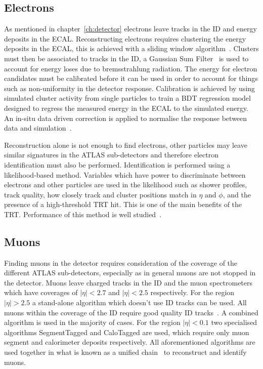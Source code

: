\subsection{Electrons}
\label{subsec:electrons}

As mentioned in chapter~\ref{ch:detector} electrons leave tracks in the ID and
energy deposits in the ECAL. Reconstructing electrons requires clustering the
energy deposits in the ECAL, this is achieved with a sliding window
algorithm~\cite{Delmastro:1747242}. Clusters must then be associated to tracks
in the ID, a Gaussian Sum Filter~\cite{ATLAS-CONF-2012-047} is used to account
for energy loses due to bremsstrahlung radiation. The energy for electron
candidates must be calibrated before it can be used in order to account for
things such as non-uniformity in the detector response. Calibration is achieved
by using simulated cluster activity from single particles to train a BDT
regression model designed to regress the measured energy in the ECAL to the
simulated energy. An in-situ data driven correction is applied to normalise the
response between data and simulation~\cite{ATL-PHYS-PUB-2016-015}.

Reconstruction alone is not enough to find electrons, other particles may leave
similar signatures in the ATLAS sub-detectors and therefore electron
identification must also be performed. Identification is performed using a
likelihood-based method. Variables which have power to discriminate between
electrons and other particles are used in the likelihood such as shower
profiles, track quality, how closely track and cluster positions match in $\eta$
and $\phi$, and the presence of a high-threshold TRT hit. This is one of the
main benefits of the TRT. Performance of this method is well
studied~\cite{ATLAS-CONF-2016-024,EgammaEffTWiki}.

\subsection{Muons}

Finding muons in the detector requires consideration of the coverage of the
different ATLAS sub-detectors, especially as in general muons are not stopped in
the detector. Muons leave charged tracks in the ID and the muon spectrometers
which have coverages of $\lvert \eta \rvert < 2.7$ and $\lvert \eta \rvert <
2.5$ respectively. For the region $\lvert \eta \rvert > 2.5$ a stand-alone
algorithm which doesn't use ID tracks can be used. All muons within the coverage
of the ID require good quality ID tracks~\cite{muonTWiki,
  MuonSelectionToolTwiki}. A combined algorithm is used in the majority of
cases. For the region $\lvert \eta  \rvert < 0.1$ two specialised algorithms
SegmentTagged and CaloTagged are used, which require only muon segment and
calorimeter deposits respectively. All aforementioned algorithms are used
together in what is known as a unified
chain~\cite{Aad:2014rra,MuonChainTWiki,ATL-PHYS-PUB-2015-037} to reconstruct and
identify muons.

